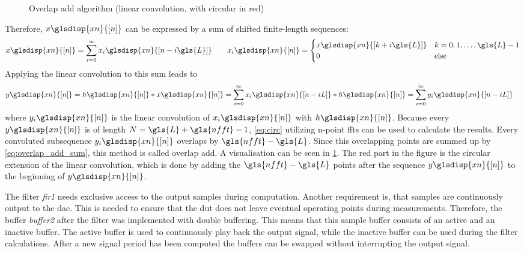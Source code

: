 \documentclass[12pt,a4paper,parskip=full,abstract=true,BCOR=12mm]{scrreprt}
\def\device#1{\mbox{\textit{#1}}}
\newcommand{\XN}{\glsdisp{xn}{[n]}}
\begin{document}
\begin{figure}[htb]
    \caption[Overlap add algorithm]{Overlap add algorithm (linear convolution, with circular in red)}
    \label{fig:overlap_add}
\end{figure}
Therefore, $x\XN$ can
be expressed by a sum of shifted finite-length sequences:
\begin{equation}
    \label{eq:sum_seq} x\XN = \sum_{i=0}^{\infty} x_i\glsdisp{xn}{[n-i\gls{L}]} \qquad x_i\XN =\begin{cases}
        x\glsdisp{xn}{[k+i\gls{L}]} & k = 0, 1, \ldots, \gls{L}-1\\
        0 & \text{else} \end{cases}
\end{equation}
Applying the linear convolution to this sum leads to
\begin{equation}
    \begin{split}\label{eq:overlap_add_sum}
        y\XN = h\XN * x\XN & = \sum_{i=0}^{\infty} x_i\glsdisp{xn}{[n-iL]} * h\XN = \sum_{i=0}^{\infty} y_i\glsdisp{xn}{[n-iL]}
    \end{split}
\end{equation}
where $y_i\XN$ is the linear convolution of $x_i\XN$ with $h\XN$. Because every $y\XN$ is of length
$N = \gls{L} + \gls{nfft} -1$, \cref{eq:circ} utilizing n-point \glspl{fft} can be used to calculate the results.
Every convoluted subsequence $y_i\XN$ overlaps by $\gls{nfft} - \gls{L}$. Since this overlapping
points are summed up by \cref{eq:overlap_add_sum}, this method is called overlap
add. A visualisation can be seen in \cref{fig:overlap_add}. The red part in the figure
is the circular extension of the linear convolution, which is done by adding the
$\gls{nfft} - \gls{L}$ points after the sequence $y\XN$ to the beginning of $y\XN$.

The filter \device{fir1} needs exclusive access to the output samples during computation.
Another requirement is, that samples are continuously output to the \gls{dac}. This
is needed to ensure that the \gls{dut} does not leave eventual operating points during
measurements. Therefore, the buffer \device{buffer2} after the filter was implemented
with double buffering. This means that this sample buffer consists of an active
and an inactive buffer. The active buffer is used to continuously play back the output
signal, while the inactive buffer can be used during the filter calculations. After
a new signal period has been computed the buffers can be swapped without interrupting
the output signal.
\end{document}

